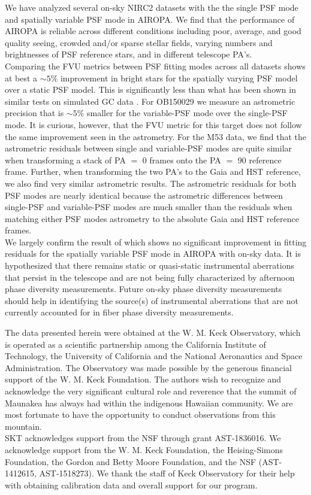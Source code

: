\documentclass[]{spie}  %
\begin{document}
\indent We have analyzed several on-sky NIRC2 datasets with the the single PSF mode and spatially variable PSF mode in AIROPA. We find that the performance of AIROPA is reliable across different conditions including poor, average, and good quality seeing, crowded and/or sparse stellar fields, varying numbers and brightnesses of PSF reference stars, and in different telescope PA's.
\\
\indent Comparing the FVU metrics between PSF fitting modes across all datasets shows at best a ${\sim}5\%$ improvement in bright stars for the spatially varying PSF model over a static PSF model. This is significantly less than what has been shown in similar tests on simulated GC data \citep{Turri:inprep}. For OB150029 we measure an astrometric precision that is ${\sim}5\%$ smaller for the variable-PSF mode over the single-PSF mode. It is curious, however, that the FVU metric for this target does not follow the same improvement seen in the astrometry. For the M53 data, we find that the astrometric residuals between single and variable-PSF modes are quite similar when transforming a stack of PA $=$ 0 frames onto the PA $=$ 90 reference frame. Further, when transforming the two PA's to the Gaia and HST reference, we also find very similar astrometric results. The astrometric residuals for both PSF modes are nearly identical because the astrometric differences between single-PSF and variable-PSF modes are much smaller than the residuals when matching either PSF modes astrometry to the absolute Gaia and HST reference frames.
\\
\indent We largely confirm the result of \cite{Turri:inprep} which shows no significant improvement in fitting residuals for the spatially variable PSF mode in AIROPA with on-sky data. It is hypothesized that there remains static or quasi-static instrumental aberrations that persist in the telescope and are not being fully characterized by afternoon phase diversity measurements. Future on-sky phase diversity measurements should help in identifying the source(s) of instrumental aberrations that are not currently accounted for in fiber phase diversity measurements. 

\acknowledgments

The data presented herein were obtained at the W. M. Keck Observatory, which is operated as a scientific partnership among the California Institute of Technology, the University of California and the National Aeronautics and Space Administration.
The Observatory was made possible by the generous financial support of the W. M. Keck Foundation.
The authors wish to recognize and acknowledge the very significant cultural role and reverence that the summit of Maunakea has always had within the indigenous Hawaiian community.
We are most fortunate to have the opportunity to conduct observations from this mountain.
\\
\indent SKT acknowledges support from the NSF through grant AST-1836016. We acknowledge support from the W. M. Keck Foundation, the Heising-Simons Foundation, the Gordon and Betty Moore Foundation, and the NSF (AST-1412615, AST-1518273). We thank the staff of Keck Observatory for their help with obtaining calibration data and overall support for our program.

\end{document}
